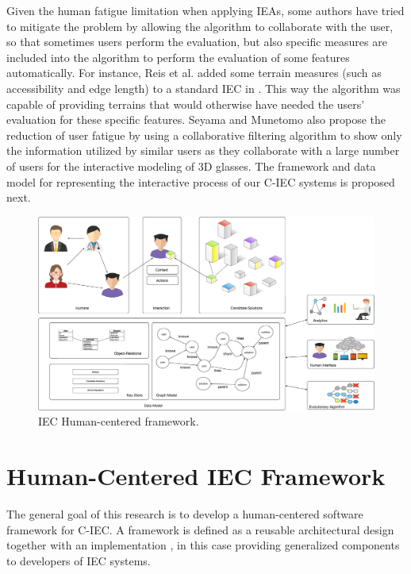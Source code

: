 Given the human fatigue limitation when applying IEAs, some authors 
have tried to mitigate the problem by allowing the algorithm to 
collaborate with the user, so that sometimes 
users perform the evaluation,  but also specific measures are included 
into the algorithm to perform the
evaluation of some features automatically. For instance, 
Reis et al. added some terrain measures (such as accessibility and edge length) 
to a standard  IEC in \cite{DBLP:journals/soco/FradeVC12}. 
This way the algorithm was capable of providing terrains that would otherwise have needed the
users' evaluation for these specific features. Seyama and Munetomo \cite{seyama2016development}
also propose the reduction of user fatigue by using 
a collaborative filtering algorithm to show only the information utilized by similar users as 
they collaborate with a large number of users for the interactive modeling of 3D glasses. 
The framework and data model for 
representing the interactive process of our C-IEC systems is proposed next.
\begin{figure}[!t]
    \centering
        \includegraphics[width=6in]{img/framework.eps}
    \caption{IEC Human-centered framework.}
    \label{fig:hc_framework}
\end{figure}

\section{Human-Centered IEC Framework}
\label{sec:framework}
The general goal of this research is to develop a human-centered \cite{gasson2003human} 
software framework for C-IEC. 
A framework is defined as a reusable architectural design together
with an implementation \cite{campbell1991choices}, in this case 
providing generalized components to developers of IEC systems. 

